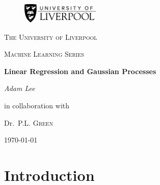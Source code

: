 \documentclass[10pt,a4paper]{article}
\author{Adam Lee}
\numberwithin{equation}{section}
\theoremstyle{plain}
\theoremstyle{own}
\begin{document}
\begin{titlepage}
\begin{figure}[h!]
\includegraphics[width=10em]{logo}
\end{figure}
\begin{center}
\vspace{10mm}
	{\scshape\LARGE The University of Liverpool \par}
	\vspace{1cm}
	{\scshape\Large Machine Learning Series \par}
	\vspace{1.5cm}
	{\huge\bfseries Linear Regression and Gaussian Processes\par}
	\vspace{2cm}
	{\Large\itshape Adam Lee\par}
	\vfill
	in collaboration with \par
	Dr.~P.L. \textsc{Green}

	\vfill


	{\large \today\par}
\end{center}
\end{titlepage}
\newpage
\tableofcontents
\pagebreak
\section*{Introduction} \label{sec:intro} 
\end{document}
